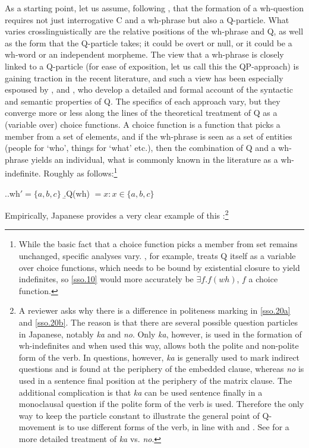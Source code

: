 \documentclass{glossa}
\begin{document}
As a starting point, let us assume, following \cite{cable:2007}, that the formation of a wh-question requires not just interrogative C and a wh-phrase but also a Q-particle. What varies crosslinguistically are the relative positions of the wh-phrase and Q, as well as the form that the Q-particle takes; it could be overt or null, or it could be a wh-word or an independent morpheme. The view that a wh-phrase is closely linked to a Q-particle (for ease of exposition, let us call this the QP-approach) is gaining traction in the recent literature, and such a view has been especially espoused by \cite{hagstrom:1998}, \cite{cable:2007} and \cite{slade:2011}, who develop a detailed and formal account of the syntactic and semantic properties of Q. The specifics of each approach vary, but they converge more or less along the lines of the theoretical treatment of Q as a (variable over) choice functions. A choice function is a function that picks a member from a set of elements, and if the wh-phrase is seen as a set of entities (people for `who', things for `what' etc.), then the combination of Q and a wh-phrase yields an individual, what is commonly known in the literature as a wh-indefinite. Roughly as follows:\footnote{While the basic fact that a choice function picks a member from set remains unchanged, specific analyses vary. \cite{cable:2007}, for example, treats Q itself as a variable over choice functions, which needs to be bound by existential closure to yield indefinites, so \ref{sso.10} would more accurately be $\exists f.f(wh)$, $f$ a choice function.}

\ex.\label{sso.10}\a.wh$' = \{a,b,c\}$
   \b.Q(wh) $= x: x \in \{a,b,c\}$

Empirically, Japanese provides a very clear example of this  \citep{hagstrom:1998}:\footnote{A reviewer asks why there is a difference in politeness marking in \ref{sso.20a} and \ref{sso.20b}. The reason is that there are several possible question particles in Japanese, notably \textit{ka} and \textit{no}. Only \textit{ka}, however, is used in the formation of wh-indefinites and when used this way, allows both the polite and non-polite form of the verb. In questions, however, \textit{ka} is generally used to mark indirect questions and is found at the periphery of the embedded clause, whereas \textit{no} is used in a sentence final position at the periphery of the matrix clause. The additional complication is that \textit{ka} can be used sentence finally in a monoclausal question if the polite form of the verb is used. Therefore the only way to keep the particle constant to illustrate the general point of Q-movement is to use different forms of the verb, in line with \cite{hagstrom:1998} and \cite{cable:2007}. See \cite{miyagawa:1987} for a more detailed treatment of \textit{ka} vs. \textit{no}.}
\end{document}
